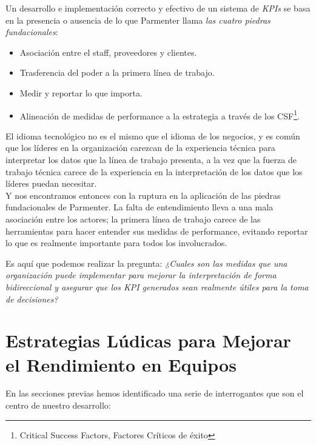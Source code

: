 \documentclass[journal]{IEEEtran}
\begin{document}
Un desarrollo e implementación correcto y efectivo de un sistema de \textit{KPIs} se basa en la presencia o ausencia de lo que Parmenter llama \textit{las cuatro piedras fundacionales}\cite[Chapter 2. Foundation Stones for Implementing Key Performance Indicators]{parmenter2015key}:
\begin{itemize}
    \item Asociación entre el staff, proveedores y clientes.
    \item Trasferencia del poder a la primera línea de trabajo.
    \item Medir y reportar lo que importa.
    \item Alineación de medidas de performance a la estrategia a través de los CSF\footnote{Critical Success Factors, Factores Críticos de éxito}.
\end{itemize}
El idioma tecnológico no es el mismo que el idioma de los negocios, y es común que los líderes en la organización carezcan de la experiencia técnica para interpretar los datos que la línea de trabajo presenta, a la vez que la fuerza de trabajo técnica carece de la experiencia en la interpretación de los datos que los líderes puedan necesitar.
\\Y nos encontramos entonces con la ruptura en la aplicación de las piedras fundacionales de Parmenter. La falta de entendimiento lleva a una mala asociación entre los actores; la primera línea de trabajo carece de las herramientas para hacer entender sus medidas de performance, evitando reportar lo que es realmente importante para todos los involucrados.

Es aquí que podemos realizar la pregunta: \textit{¿Cuales son las medidas que una organización puede implementar para mejorar la interpretación de forma bidireccional y asegurar que los \textit{KPI} generados sean realmente útiles para la toma de decisiones?}

\section{\textbf{\Large Estrategias Lúdicas para Mejorar el Rendimiento en Equipos}}

En las secciones previas hemos identificado una serie de interrogantes que son el centro de nuestro desarrollo:
\end{document}
